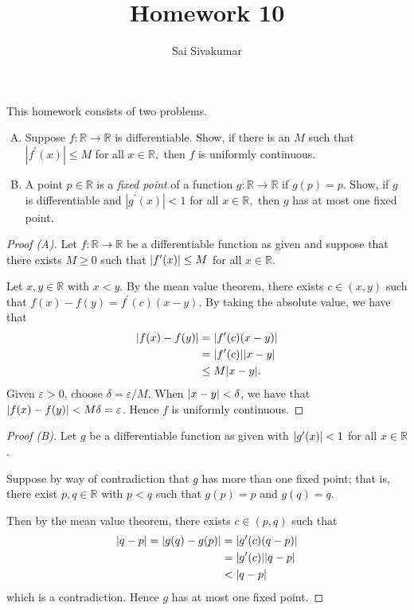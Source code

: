 \documentclass[12pt]{amsart}
\title{Homework 10}
\author{Sai Sivakumar}
\begin{document}
\maketitle

This homework consists of two problems.

\begin{enumerate}[(A)] \itemsep=10pt
 \item Suppose $f:\mathbb{R}\to\mathbb{R}$ is differentiable. Show, if
 there is an $M$ such that $|f^\prime(x)|\le M$ for all $x\in \mathbb{R},$
 then $f$ is uniformly continuous.

\item A point $p\in\mathbb{R}$ is a \emph{fixed point} of a function 
 $g:\mathbb{R}\to\mathbb{R}$ if $g(p)=p.$ Show, if $g$ is differentiable
 and $|g^\prime(x)|<1$ for all $x\in \mathbb{R},$ then $g$ has
 at most one fixed  point.
\end{enumerate}
 
\begin{proof}[Proof (A)]
    Let $f\colon\mathbb{R}\to \mathbb{R}$ be a differentiable function as given and suppose that there exists $M\geq 0$ such that $\abs{f^{\prime}(x)}\leq M$ for all $x\in \mathbb{R}$.

    Let $x,y\in \mathbb{R}$ with $x < y$. By the mean value theorem, there exists $c\in (x,y)$ such that $f(x)-f(y) = f^{\prime}(c)(x-y)$. By taking the absolute value, we have that \begin{align*}
        \abs{f(x)-f(y)} &= \abs{f^{\prime}(c)(x-y)}\\
        &= \abs{f^{\prime}(c)}\abs{x-y}\\
        &\leq M\abs{x-y}.
    \end{align*}
    Given $\varepsilon> 0$, choose $\delta = \varepsilon/M$. When $\abs{x-y}< \delta$, we have that $\abs{f(x)-f(y)} < M\delta = \varepsilon$. Hence $f$ is uniformly continuous.
\end{proof}
\begin{proof}[Proof (B)]
    Let $g$ be a differentiable function as given with $\abs{g^{\prime}(x)}< 1$ for all $x\in\mathbb{R}$.

    Suppose by way of contradiction that $g$ has more than one fixed point; that is, there exist $p,q\in\mathbb{R}$ with $p < q$ such that $g(p) = p$ and $g(q)= q$.

    Then by the mean value theorem, there exists $c\in (p,q)$ such that \begin{align*}
        \abs{q-p} = \abs{g(q)-g(p)} &= \abs{g^{\prime}(c)(q-p)}\\
        &= \abs{g^{\prime}(c)}\abs{q-p}\\
        &< \abs{q-p}
    \end{align*} which is a contradiction. Hence $g$ has at most one fixed point.
\end{proof}
\end{document}
